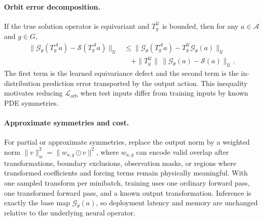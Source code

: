 \paragraph{Orbit error decomposition.} If the true solution operator is equivariant and \(T_g^{\mathcal U}\) is bounded, then for any \(a\in\mathcal A\) and \(g\in G\),
\begin{align}
\|\mathcal G_\theta(T_g^{\mathcal A}a)-\mathcal S(T_g^{\mathcal A}a)\|_{\mathcal U}
&\le \|\mathcal G_\theta(T_g^{\mathcal A}a)-T_g^{\mathcal U}\mathcal G_\theta(a)\|_{\mathcal U} \nonumber\\
&\quad+\|T_g^{\mathcal U}\|\,\|\mathcal G_\theta(a)-\mathcal S(a)\|_{\mathcal U}.
\end{align}
The first term is the learned equivariance defect and the second term is the in-distribution prediction error transported by the output action. This inequality motivates reducing \(\mathcal L_{\mathrm{orb}}\) when test inputs differ from training inputs by known PDE symmetries.

\paragraph{Approximate symmetries and cost.} For partial or approximate symmetries, replace the output norm by a weighted norm \(\|v\|_w^2=\|w_{a,g}\odot v\|^2\), where \(w_{a,g}\) can encode valid overlap after transformations, boundary exclusions, observation masks, or regions where transformed coefficients and forcing terms remain physically meaningful. With one sampled transform per minibatch, training uses one ordinary forward pass, one transformed forward pass, and a known output transformation. Inference is exactly the base map \(\mathcal G_\theta(a)\), so deployment latency and memory are unchanged relative to the underlying neural operator.
